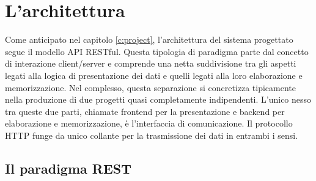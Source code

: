 \chapter{L'architettura}\label{c:architecture}

Come anticipato nel capitolo \ref{c:project}, l'architettura del sistema progettato segue il modello API RESTful.
Questa tipologia di paradigma parte dal concetto di interazione client/server e comprende una netta suddivisione tra gli aspetti legati alla logica di presentazione dei dati
e quelli legati alla loro elaborazione e memorizzazione.
Nel complesso, questa separazione si concretizza tipicamente nella produzione di due progetti quasi completamente indipendenti.
L'unico nesso tra queste due parti, chiamate frontend per la presentazione e backend per elaborazione e memorizzazione, è l'interfaccia di comunicazione.
Il protocollo HTTP funge da unico collante per la trasmissione dei dati in entrambi i sensi.

\section{Il paradigma REST}

